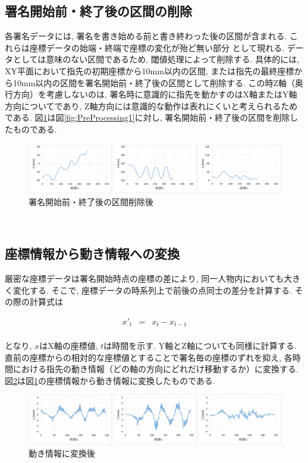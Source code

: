 \subsection{署名開始前・終了後の区間の削除}
各署名データには, 署名を書き始める前と書き終わった後の区間が含まれる. これらは座標データの始端・終端で座標の変化が殆ど無い部分
として現れる. データとしては意味のない区間であるため, 閾値処理によって削除する. 具体的には, XY平面において指先の初期座標から10mm以内の区間, または指先の最終座標から10mm以内の区間を署名開始前・終了後の区間として削除する. この時Z軸（奥行方向）を考慮しないのは, 署名時に意識的に指先を動かすのはX軸またはY軸方向についてであり, Z軸方向には意識的な動作は表れにくいと考えられるためである. 図\ref{fig:PreProcessing2}は図\ref{fig:PreProcessing1}に対し, 署名開始前・終了後の区間を削除したものである.
\\
\begin{figure}[htbp]
  \begin{center}
    \includegraphics[clip,width=16.0cm]{./images/PreProcessing2.png}
    \caption{署名開始前・終了後の区間削除後}
    \label{fig:PreProcessing2}
  \end{center}
\end{figure}\\

\subsection{座標情報から動き情報への変換}

厳密な座標データは署名開始時点の座標の差により, 同一人物内においても大きく変化する. そこで, 座標データの時系列上で前後の点同士の差分を計算する. その際の計算式は

\begin{eqnarray}
x'_t & = & x_t - x_{t-1} \label{eq:eq1}
\end{eqnarray}
\\
となり, $x$はX軸の座標値, $t$は時間を示す. Y軸とZ軸についても同様に計算する. 直前の座標からの相対的な座標値とすることで署名毎の座標のずれを抑え, 各時間における指先の動き情報（どの軸の方向にどれだけ移動するか）に変換する. 図\ref{fig:PreProcessing3}は図\ref{fig:PreProcessing2}の座標情報から動き情報に変換したものである.
\\
\begin{figure}[htbp]
  \begin{center}
    \includegraphics[clip,width=16.0cm]{./images/PreProcessing3.png}
    \caption{動き情報に変換後}
    \label{fig:PreProcessing3}
  \end{center}
\end{figure}\\

